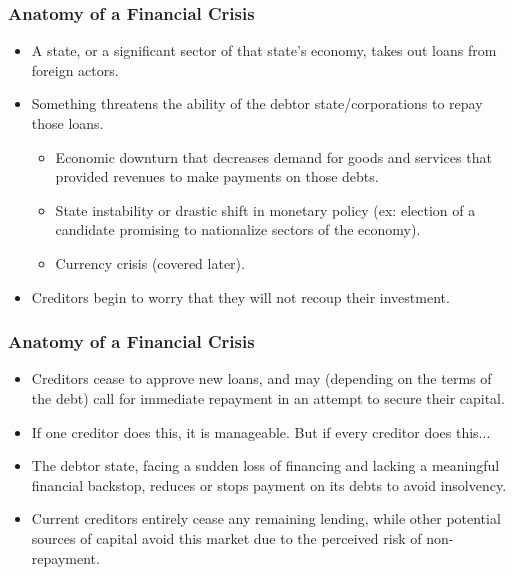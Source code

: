 \documentclass{beamer}
\begin{document}
\begin{frame} 
	\frametitle{\LARGE{Anatomy of a Financial Crisis}}
	\begin{itemize}
		\item A state, or a significant sector of that state's economy, takes out loans from foreign actors. \pause
		\item Something threatens the ability of the debtor state/corporations to repay those loans. \pause
		\begin{itemize}
			\item Economic downturn that decreases demand for goods and services that provided revenues to make payments on those debts. \pause
			\item State instability or drastic shift in monetary policy (ex: election of a candidate promising to nationalize sectors of the economy). \pause
			\item Currency crisis (covered later).
		\end{itemize}
	\item Creditors begin to worry that they will not recoup their investment.
	\end{itemize}
\end{frame}

\begin{frame} 
	\frametitle{\LARGE{Anatomy of a Financial Crisis}}
	\begin{itemize}
		\item Creditors cease to approve new loans, and may (depending on the terms of the debt) call for immediate repayment in an attempt to secure their capital. \pause
		\item If one creditor does this, it is manageable. But if every creditor does this... \pause
		\item The debtor state, facing a sudden loss of financing and lacking a meaningful financial backstop, reduces or stops payment on its debts to avoid insolvency. \pause
		\item Current creditors entirely cease any remaining lending, while other potential sources of capital avoid this market due to the perceived risk of non-repayment. 	
	\end{itemize}
\end{frame}
\end{document}
